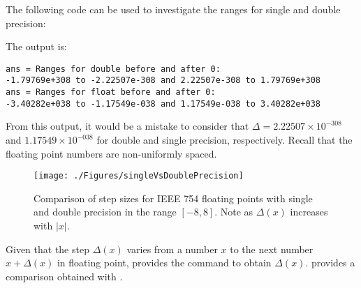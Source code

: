 The following {\matlab} code can be used to investigate the ranges for single and double precision:

The output is:
\begin{verbatim}
ans = Ranges for double before and after 0:
-1.79769e+308 to -2.22507e-308 and 2.22507e-308 to 1.79769e+308
ans = Ranges for float before and after 0:
-3.40282e+038 to -1.17549e-038 and 1.17549e-038 to 3.40282e+038
\end{verbatim}
From this output, it would be a mistake to consider that $\Delta = 2.22507 \times 10^{-308}$ and $1.17549 \times 10^{-038}$ for double and single precision, respectively. Recall that the floating point numbers are non-uniformly spaced.

\begin{figure}
\centering
\texttt{[image: ./Figures/singleVsDoublePrecision]}
\caption[Comparison of step sizes for IEEE 754 floating points with single and double precision]{Comparison of step sizes for IEEE 754 floating points with single and double precision in the range $[-8,8]$. Note as $\Delta(x)$ increases with $|x|$.\label{fig:singleVsDoublePrecision}}
\end{figure}

Given that the step $\Delta(x)$ varies from a number $x$ to the next number $x + \Delta(x)$ in floating point, {\matlab} provides the command  to obtain $\Delta(x)$.  provides a comparison obtained with .


